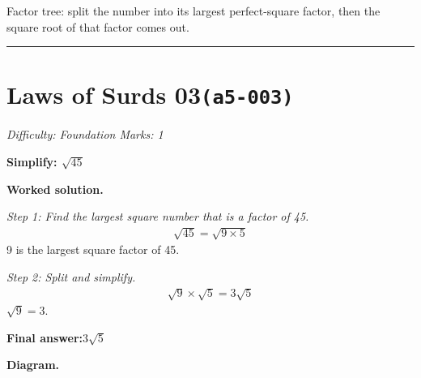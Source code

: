 \documentclass[11pt]{article}
\newcommand{\question}[1]{\par\medskip\noindent\textbf{#1}\par}
\begin{document}
\begin{center}
\end{center}
\small Factor tree: split the number into its largest perfect-square factor, then the square root of that factor comes out.\normalsize

\medskip\hrule

\section*{Laws of Surds 03\quad\small\texttt{(a5-003)}}
\textit{Difficulty: Foundation \quad\textbar\quad Marks: 1}

\question{Simplify: \( \sqrt{45} \)}

\textbf{Worked solution.}

\textit{Step 1: Find the largest square number that is a factor of 45.}
\[\begin{gathered}
\sqrt{45} = \sqrt{9 \times 5}
\end{gathered}\]
9 is the largest square factor of 45.

\textit{Step 2: Split and simplify.}
\[\begin{gathered}
\sqrt{9} \times \sqrt{5} = 3\sqrt{5}
\end{gathered}\]
\( \sqrt{9} = 3 \).

\begin{answerbox}
\textbf{Final answer:}\quad \(\displaystyle 3\sqrt{5}\)
\end{answerbox}
\textbf{Diagram.}
\end{document}
